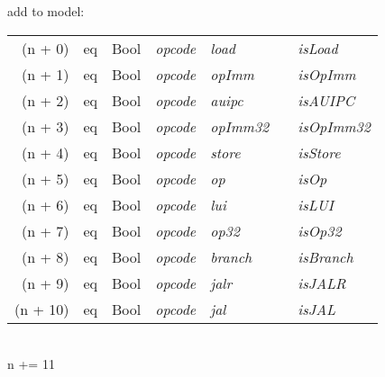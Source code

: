 \begin{algorithm}
    add to model:\\
    \begin{tabular}[h]{>{\ttfamily\color{UniRed}}r >{\ttfamily}l >{\ttfamily\color{UniGrey}}l >{\slshape\color{UniRed}}l >{\slshape\color{UniRed}}l >{\slshape\color{UniRed}}l >{\slshape} l}
        \hline
        \hline
        (n + 0)  & eq & Bool & opcode & load    &  & isLoad    \\
        (n + 1)  & eq & Bool & opcode & opImm   &  & isOpImm   \\
        (n + 2)  & eq & Bool & opcode & auipc   &  & isAUIPC   \\
        (n + 3)  & eq & Bool & opcode & opImm32 &  & isOpImm32 \\
        (n + 4)  & eq & Bool & opcode & store   &  & isStore   \\
        (n + 5)  & eq & Bool & opcode & op      &  & isOp      \\
        (n + 6)  & eq & Bool & opcode & lui     &  & isLUI     \\
        (n + 7)  & eq & Bool & opcode & op32    &  & isOp32    \\
        (n + 8)  & eq & Bool & opcode & branch  &  & isBranch  \\
        (n + 9)  & eq & Bool & opcode & jalr    &  & isJALR    \\
        (n + 10) & eq & Bool & opcode & jal     &  & isJAL     \\
        \hline
        \hline
    \end{tabular}\\
    \textcolor{UniRed}{n} += 11\\
\end{algorithm}
